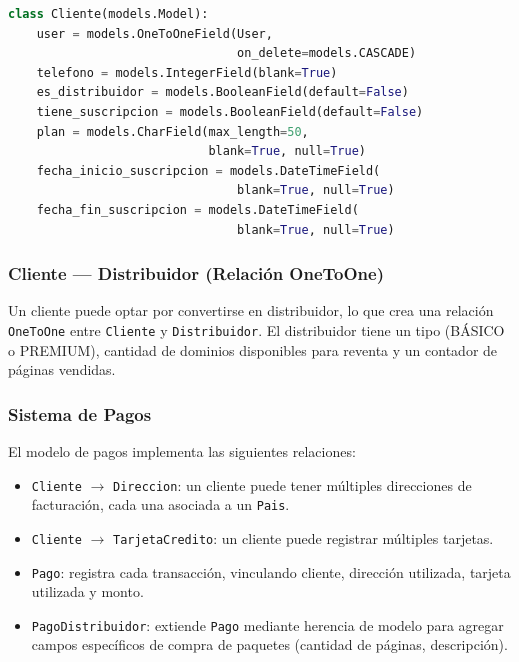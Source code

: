 \documentclass[12pt, a4paper]{article}
\begin{document}
\begin{lstlisting}[language=Python, caption={Modelo Cliente con OneToOneField}]
class Cliente(models.Model):
    user = models.OneToOneField(User,
                                on_delete=models.CASCADE)
    telefono = models.IntegerField(blank=True)
    es_distribuidor = models.BooleanField(default=False)
    tiene_suscripcion = models.BooleanField(default=False)
    plan = models.CharField(max_length=50,
                            blank=True, null=True)
    fecha_inicio_suscripcion = models.DateTimeField(
                                blank=True, null=True)
    fecha_fin_suscripcion = models.DateTimeField(
                                blank=True, null=True)
\end{lstlisting}

\subsubsection{Cliente --- Distribuidor (Relación OneToOne)}

Un cliente puede optar por convertirse en distribuidor, lo que crea una relación \texttt{OneToOne} entre \texttt{Cliente} y \texttt{Distribuidor}. El distribuidor tiene un tipo (BÁSICO o PREMIUM), cantidad de dominios disponibles para reventa y un contador de páginas vendidas.

\subsubsection{Sistema de Pagos}

El modelo de pagos implementa las siguientes relaciones:

\begin{itemize}
    \item \texttt{Cliente} $\rightarrow$ \texttt{Direccion}: un cliente puede tener múltiples direcciones de facturación, cada una asociada a un \texttt{Pais}.
    \item \texttt{Cliente} $\rightarrow$ \texttt{TarjetaCredito}: un cliente puede registrar múltiples tarjetas.
    \item \texttt{Pago}: registra cada transacción, vinculando cliente, dirección utilizada, tarjeta utilizada y monto.
    \item \texttt{PagoDistribuidor}: extiende \texttt{Pago} mediante herencia de modelo para agregar campos específicos de compra de paquetes (cantidad de páginas, descripción).
\end{itemize}
\end{document}

